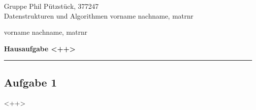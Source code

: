 \documentclass[a4paper,graphics,11pt]{article}
\newcommand{\aufgabe}[1]{\subsection*{Aufgabe #1}}
\begin{document}
\noindent Gruppe              \hfill Phil Pützstück, 377247\\
\noindent Datenstrukturen und Algorithmen \hfill vorname nachname, matrnr\\
\strut\hfill vorname nachname, matrnr\\
\begin{center}
	\LARGE{\textbf{Hausaufgabe <++>}}
\end{center}
\begin{center}
\rule[0.1ex]{\textwidth}{1pt}
\end{center}



\aufgabe{1}
<++>
\end{document}
